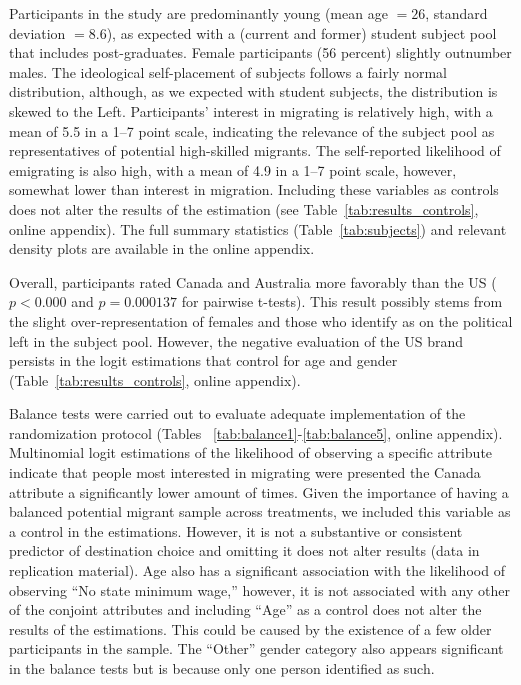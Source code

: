 \documentclass[12pt]{article}
\begin{document}
\par Participants in the study are predominantly young (mean age $=26$, standard deviation $=8.6$), as expected with a (current and former) student subject pool that includes post-graduates. Female participants (56 percent) slightly outnumber males. The ideological self-placement of subjects follows a fairly normal distribution, although, as we expected with student subjects, the distribution is skewed to the Left. Participants' interest in migrating is relatively high, with a mean of 5.5 in a 1--7 point scale, indicating the relevance of the subject pool as representatives of potential high-skilled migrants. The self-reported likelihood of emigrating is also high, with a mean of 4.9 in a 1--7 point scale, however, somewhat lower than interest in migration. Including these variables as controls does not alter the results of the estimation (see Table~\ref{tab:results_controls}, online appendix). The full summary statistics (Table~\ref{tab:subjects}) and relevant density plots are available in the online appendix.

\par Overall, participants rated Canada and Australia more favorably than the US ($p<0.000$ and $p = 0.000137$ for pairwise t-tests). This result possibly stems from the slight over-representation of females and those who identify as on the political left in the subject pool. However, the negative evaluation of the US brand persists in the logit estimations that control for age and gender (Table~\ref{tab:results_controls}, online appendix).

\par Balance tests were carried out to evaluate adequate implementation of the randomization protocol (Tables ~\ref{tab:balance1}-\ref{tab:balance5}, online appendix). Multinomial logit estimations of the likelihood of observing a specific attribute indicate that people most interested in migrating were presented the Canada attribute a significantly lower amount of times. Given the importance of having a balanced potential migrant sample across treatments, we included this variable as a control in the estimations. However, it is not a substantive or consistent predictor of destination choice and omitting it does not alter results (data in replication material). Age also has a significant association with the likelihood of observing ``No state minimum wage,'' however, it is not associated with any other of the conjoint attributes and including ``Age'' as a control does not alter the results of the estimations. This could be caused by the existence of a few older participants in the sample. The ``Other'' gender category also appears significant in the balance tests but is because only one person identified as such.
\end{document}
